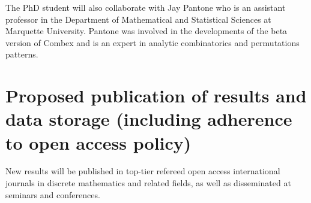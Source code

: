 \documentclass{rannis}
\newcommand{\motheralg}{\textsf{Combex}}
\theoremstyle{definition}
\begin{document}
The PhD student will also collaborate with Jay Pantone who is an
assistant professor in the
Department of Mathematical and Statistical Sciences at Marquette University.
Pantone was involved in the developments of
the beta version of \motheralg{} and is an expert in analytic combinatorics and
permutations patterns.
\\

\section{Proposed publication of results and data storage (including adherence to open access policy)}
New results will be published in top-tier refereed open access
international journals in discrete mathematics and related fields, as well as
disseminated at seminars and conferences.
\\%
\label{LastPageOfDescription}
\clearpage
\setcounter{page}{1}
\renewcommand{\lastpageref}{\pageref{LastPage}}%



\end{document}
